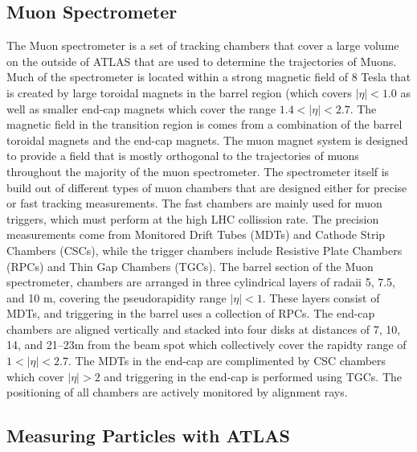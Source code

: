 \subsection{Muon Spectrometer}
The Muon spectrometer is a set of tracking chambers that cover a large volume on the outside of ATLAS that are used to determine the trajectories of Muons.
Much of the spectrometer is located within a strong magnetic field of 8 Tesla that is created by large toroidal magnets in the barrel region (which covers $|\eta| < 1.0$ as well as smaller end-cap magnets which cover the range $1.4 < |\eta| < 2.7$. 
The magnetic field in the transition region is comes from a combination of the barrel toroidal magnets and the end-cap magnets.
The muon magnet system is designed to provide a field that is mostly orthogonal to the trajectories of muons throughout the majority of the muon spectrometer.
The spectrometer itself is build out of different types of muon chambers that are designed either for precise or fast tracking measurements.
The fast chambers are mainly used for muon triggers, which must perform at the high LHC collission rate.
The precision measurements come from Monitored Drift Tubes (MDTs) and Cathode Strip Chambers (CSCs), while the trigger chambers include Resistive Plate Chambers (RPCs) and Thin Gap Chambers (TGCs).
The barrel section of the Muon spectrometer, chambers are arranged in three cylindrical layers of radaii 5, 7.5, and 10 m, covering the pseudorapidity range $|\eta| < 1$.
These layers consist of MDTs, and triggering in the barrel uses a collection of RPCs.
The end-cap chambers are aligned vertically and stacked into four disks at distances of 7, 10, 14, and 21–23m from the beam spot which collectively cover the rapidty range of $1 <|\eta|< 2.7$. 
The MDTs in the end-cap are complimented by CSC chambers which cover $|\eta| > 2$ and triggering in the end-cap is performed using TGCs.
The positioning of all chambers are actively monitored by alignment rays.


\subsection{Measuring Particles with ATLAS}


